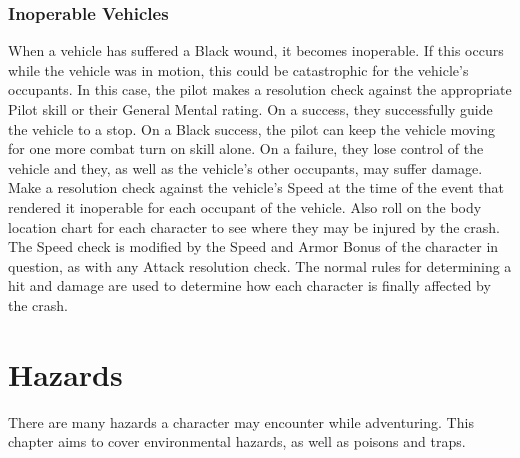 \documentclass[oneside]{book}
\begin{document}
\begin{multicols}{2}
\subsection{Inoperable Vehicles}

When a vehicle has suffered a Black wound, it becomes inoperable. If this occurs while the vehicle was in motion, this could be catastrophic for the vehicle's occupants. In this case, the pilot makes a resolution check against the appropriate Pilot skill or their General Mental rating. On a success, they successfully guide the vehicle to a stop. On a Black success, the pilot can keep the vehicle moving for one more combat turn on skill alone. On a failure, they lose control of the vehicle and they, as well as the vehicle's other occupants, may suffer damage. Make a resolution check against the vehicle's Speed at the time of the event that rendered it inoperable for each occupant of the vehicle. Also roll on the body location chart for each character to see where they may be injured by the crash. The Speed check is modified by the Speed and Armor Bonus of the character in question, as with any Attack resolution check. The normal rules for determining a hit and damage are used to determine how each character is finally affected by the crash. 

\end{multicols}


\chapter{Hazards}

There are many hazards a character may encounter while adventuring. This chapter aims to cover environmental hazards, as well as poisons and traps. 
\end{document}
